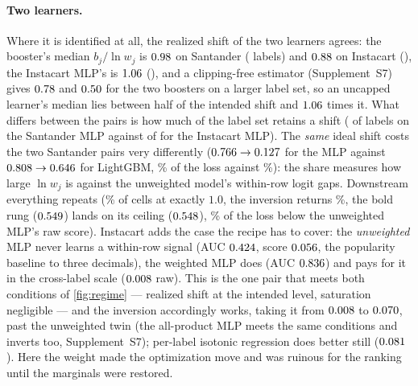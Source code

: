 \documentclass[sigconf,nonacm]{acmart}
\newcommand{\Supp}[1]{Supplement~#1}  %
\begin{document}
\paragraph{Two learners.} Where it is identified at all, the realized shift of the two learners agrees: the booster's median $b_j/\ln w_j$ is $0.98$ on Santander (\nSnIdentShift{} labels) and $0.88$ on Instacart (\nISnIdentShift), the Instacart MLP's is $1.06$ (\nIMSnIdentShift), and a clipping-free estimator (\Supp{S7}) gives $0.78$ and $0.50$ for the two boosters on a larger label set, so an uncapped learner's median lies between half of the intended shift and $1.06$ times it. What differs between the pairs is how much of the label set retains a shift (\nMSnIdentShift{} of \nnLabels{} labels on the Santander MLP against \nIMSnIdentShift{} of \nInLabels{} for the Instacart MLP). The \emph{same} ideal shift costs the two Santander pairs very differently ($0.766\to0.127$ for the MLP against $0.808\to0.646$ for LightGBM, \nModdsShare\% of the loss against \noddsShare\%): the share measures how large $\ln w_j$ is against the unweighted model's within-row logit gaps. Downstream everything repeats (\nMSsatOne\% of cells at exactly $1.0$, the inversion returns \nMelkanShare\%, the bold rung ($0.549$) lands on its ceiling ($0.548$), \nMtieShare\% of the loss below the unweighted MLP's raw score). Instacart adds the case the recipe has to cover: the \emph{unweighted} MLP never learns a within-row signal (AUC $0.424$, score $0.056$, the popularity baseline to three decimals), the weighted MLP does (AUC $0.836$) and pays for it in the cross-label scale ($0.008$ raw). This is the one pair that meets both conditions of \cref{fig:regime} --- realized shift at the intended level, saturation negligible --- and the inversion accordingly works, taking it from $0.008$ to $0.070$, past the unweighted twin (the all-product MLP meets the same conditions and inverts too, \Supp{S7}); per-label isotonic regression does better still ($0.081$). Here the weight made the optimization move and was ruinous for the ranking until the marginals were restored.
\end{document}
